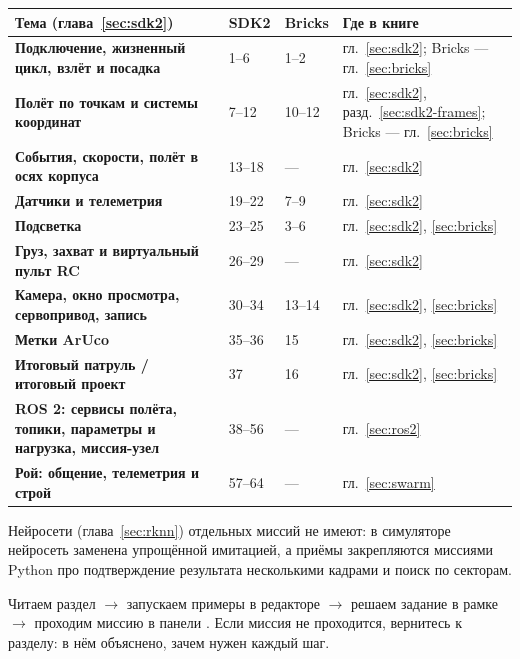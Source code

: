 \begin{center}
\small
\begin{tabularx}{\linewidth}{@{}>{\bfseries}X l l X@{}}
\toprule
Тема (глава~\ref{sec:sdk2}) & SDK2 & Bricks & Где в книге \\
\midrule
Подключение, жизненный цикл, взлёт и посадка & 1--6 & 1--2 & гл.~\ref{sec:sdk2}; Bricks --- гл.~\ref{sec:bricks} \\
Полёт по точкам и системы координат & 7--12 & 10--12 & гл.~\ref{sec:sdk2}, разд.~\ref{sec:sdk2-frames}; Bricks --- гл.~\ref{sec:bricks} \\
События, скорости, полёт в осях корпуса & 13--18 & --- & гл.~\ref{sec:sdk2} \\
Датчики и телеметрия & 19--22 & 7--9 & гл.~\ref{sec:sdk2} \\
Подсветка & 23--25 & 3--6 & гл.~\ref{sec:sdk2}, \ref{sec:bricks} \\
Груз, захват и виртуальный пульт RC & 26--29 & --- & гл.~\ref{sec:sdk2} \\
Камера, окно просмотра, сервопривод, запись & 30--34 & 13--14 & гл.~\ref{sec:sdk2}, \ref{sec:bricks} \\
Метки ArUco & 35--36 & 15 & гл.~\ref{sec:sdk2}, \ref{sec:bricks} \\
Итоговый патруль / итоговый проект & 37 & 16 & гл.~\ref{sec:sdk2}, \ref{sec:bricks} \\
ROS 2: сервисы полёта, топики, параметры и нагрузка, миссия-узел & 38--56 & --- & гл.~\ref{sec:ros2} \\
Рой: общение, телеметрия и строй & 57--64 & --- & гл.~\ref{sec:swarm} \\
\bottomrule
\end{tabularx}
\end{center}

Нейросети (глава~\ref{sec:rknn}) отдельных миссий не имеют: в симуляторе нейросеть заменена упрощённой имитацией, а приёмы закрепляются миссиями Python про подтверждение результата несколькими кадрами и поиск по секторам.

\begin{rulebox}
Читаем раздел $\to$ запускаем примеры в редакторе $\to$ решаем задание в рамке $\to$ проходим миссию в панели . Если миссия не проходится, вернитесь к разделу: в нём объяснено, зачем нужен каждый шаг.
\end{rulebox}
